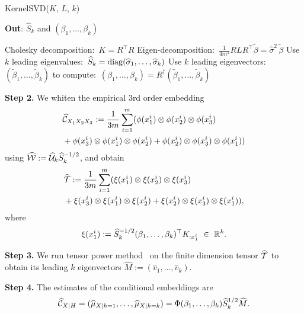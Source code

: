 \documentclass{article}
\begin{document}
\begin{algorithm}[t!]
\caption{KernelSVD($K$, $L$, $k$)}
	\textbf{Out}: $\widehat S_k$ and $(\beta_1,\ldots,\beta_k)$\\[-0.4cm]
  \begin{algorithmic}[1]
    \STATE Cholesky decomposition:\ $K=R^\top R$
    \STATE Eigen-decomposition:\ $\frac{1}{4m^2} R L R^\top \widetilde{\beta} = \widehat \sigma^2\,\widetilde{\beta}$
    \STATE Use $k$ leading eigenvalues:\ $\widehat S_k = \mathop{\mathrm{diag}}(\widehat \sigma_1,\ldots,\widehat \sigma_k)$
    \STATE Use $k$ leading eigenvectors:\ $(\widetilde{\beta}_1,\ldots,\widetilde{\beta}_k)$ to
    compute:\ $(\beta_1,\ldots,\beta_k) = R^\dagger (\widetilde{\beta}_1,\ldots,\widetilde{\beta}_k)$
  \end{algorithmic}
  \label{alg:svd}
\end{algorithm}

{\bf Step 2.} We whiten the empirical 3rd order embedding
\begin{align*}
  &\widehat {\mathcal{C}}_{X_1 X_2 X_3}:= \frac{1}{3m}\sum_{i=1}^{m} (\phi(x_1^i) \otimes \phi(x_2^i) \otimes \phi(x_3^i) \\
  &+ \phi(x_3^i) \otimes \phi(x_1^i) \otimes \phi(x_2^i) + \phi(x_2^i) \otimes \phi(x_3^i) \otimes \phi(x_1^i))
\end{align*}
using $\widehat {\mathcal{W}}:= \widehat {\mathcal{U}}_k \widehat S_k^{-1/2}$, and obtain
\begin{align*}
  &\widehat {{\mathcal{T}}} := \frac{1}{3m}\sum_{i=1}^m (\xi(x_1^i) \otimes \xi(x_2^i) \otimes \xi(x_3^i) \\
  &+ \xi(x_3^i) \otimes \xi(x_1^i) \otimes \xi(x_2^i) + \xi(x_2^i) \otimes \xi(x_3^i) \otimes \xi(x_1^i)),
\end{align*}
where
$$
	\xi(x_1^i) := \widehat S_k^{-1/2} (\beta_1,\ldots,\beta_k)^\top K_{:x_1^i}~ \in~\mathbb{R}^k.
$$

{\bf Step 3.} We run tensor power method~\cite{AnandkumarEtal:community12} on the finite dimension tensor $\widehat {{\mathcal{T}}}$ to obtain its leading $k$ eigenvectors $\widehat M:=(\widehat v_1,\ldots,\widehat v_k)$.

{\bf Step 4.} The estimates of the conditional embeddings are
\begin{align*}
  \widehat {\mathcal{C}}_{X|H} = (\widehat \mu_{X|h=1},\ldots, \widehat \mu_{X|h=k}) = \Phi (\beta_1,\ldots,\beta_k) \widehat  S_k^{1/2} \widehat M.
\end{align*}
\end{document}
